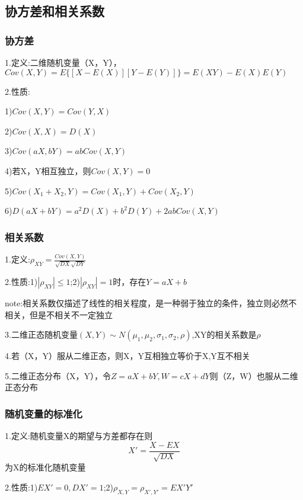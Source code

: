 \documentclass[11pt,twoside,a4paper]{ctexart}
\begin{document}
    \subsection{协方差和相关系数}

    \subsubsection{协方差}

    1.定义:二维随机变量（X，Y），$Cov(X,Y) = E\{[X - E(X)][Y - E(Y)]\} = E(XY) - E(X)E(Y)$

    2.性质:
    \begin{minipage}[t]{0.9\linewidth}
        1)$Cov(X,Y) = Cov(Y,X)$

        2)$Cov(X,X) = D(X)$

        3)$Cov(aX,bY) = abCov(X,Y)$

        4)若X，Y相互独立，则$Cov(X,Y) = 0$

        5)$Cov(X_1 + X_2 , Y) = Cov(X_1 , Y) + Cov(X_2 , Y)$

        6)$D(aX + bY) = a^2D(X) + b^2D(Y) + 2abCov(X,Y)$
        
    \end{minipage}

    \subsubsection{相关系数}

    1.定义:$\rho _{XY} = \frac{Cov(X,Y)}{\sqrt{DX} \sqrt{DY}}$

    2.性质:1)$|\rho _{XY}| \leq 1 $;2)$|\rho _{XY}| = 1$时，存在$Y = aX + b$

    note:相关系数仅描述了线性的相关程度，是一种弱于独立的条件，独立则必然不相关，但是不相关不一定独立

    3.二维正态随机变量$(X,Y)\sim N(\mu _1,\mu_2,\sigma _1,\sigma _2,\rho)$,XY的相关系数是$\rho $

    4.若（X，Y）服从二维正态，则X，Y互相独立等价于X,Y互不相关

    5.二维正态分布（X，Y），令$Z = aX + bY,W = cX + dY$则（Z，W）也服从二维正态分布

    \subsubsection{随机变量的标准化}
    
    1.定义:随机变量X的期望与方差都存在则
    \[X' = \frac{X - EX}{\sqrt{DX}}\]
    为X的标准化随机变量

    2.性质:1)$EX' = 0,DX' = 1$;2)$\rho _{X,Y} = \rho _{X',Y'} = EX'Y'$
\end{document}
